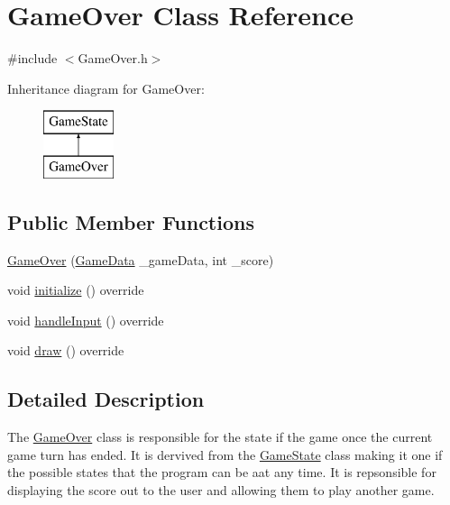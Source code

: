 \hypertarget{class_game_over}{}\section{Game\+Over Class Reference}
\label{class_game_over}


{\ttfamily \#include $<$Game\+Over.\+h$>$}

Inheritance diagram for Game\+Over\+:\begin{figure}[H]
\begin{center}
\leavevmode
\includegraphics[height=2.000000cm]{class_game_over}
\end{center}
\end{figure}
\subsection*{Public Member Functions}
\begin{DoxyCompactItemize}
\item 
\mbox{\hyperlink{class_game_over_ae8969c43377583bf4d81c048718f8d94}{Game\+Over}} (\mbox{\hyperlink{_engine_8h_a5bbe002e9f7f45a67e8fda9dbe980a3f}{Game\+Data}} \+\_\+game\+Data, int \+\_\+score)
\item 
void \mbox{\hyperlink{class_game_over_a973dbbd0bfc74c540b933853202b46a4}{initialize}} () override
\item 
void \mbox{\hyperlink{class_game_over_ad503a45f38d4472d3a91c096390c4aea}{handle\+Input}} () override
\item 
void \mbox{\hyperlink{class_game_over_a29ee6ef26eca92bac58c9917e933bce4}{draw}} () override
\end{DoxyCompactItemize}


\subsection{Detailed Description}
The \mbox{\hyperlink{class_game_over}{Game\+Over}} class is responsible for the state if the game once the current game turn has ended. It is dervived from the \mbox{\hyperlink{class_game_state}{Game\+State}} class making it one if the possible states that the program can be aat any time. It is repsonsible for displaying the score out to the user and allowing them to play another game. 

